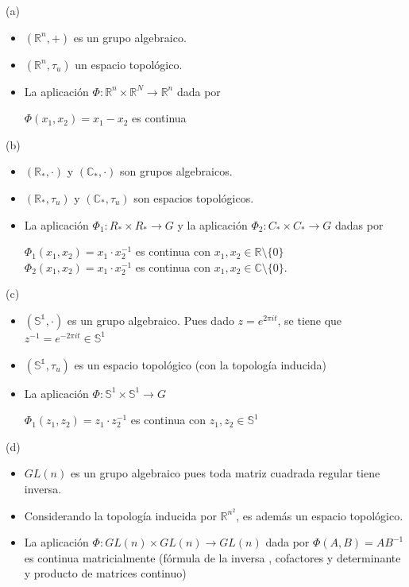 \documentclass[
  a4paper,
  spanish,
  12pt,
]{scrartcl}
\begin{document}
\begin{sol}

(a)

\begin{itemize}
\item{$(\mathbb{R}^n, +)$ es un grupo algebraico.}
\item{$(\mathbb{R}^n, \tau_u)$ un espacio topológico.}
\item{La aplicación $\Phi: \mathbb{R}^n \times \mathbb{R}^N \rightarrow \mathbb{R}^n$ dada por

$\Phi(x_1, x_2) = x_1 - x_2$ es continua}
\end{itemize}

(b)

\begin{itemize}
\item{$(\mathbb{R_*}, \cdot)$ y $(\mathbb{C_*}, \cdot)$ son grupos algebraicos.}
\item{$(\mathbb{R_*}, \tau_u)$ y $(\mathbb{C_*}, \tau_u)$ son espacios topológicos.}
\item{La aplicación $\Phi_1: R_* \times R_* \rightarrow G$  y la 
aplicación $\Phi_2: C_* \times C_* \rightarrow G$ dadas por
	
$\Phi_1(x_1, x_2) = x_1 \cdot x_2^{-1}$ es continua con $x_1, x_2 \in \mathbb{R} \setminus \{0\}$ \\
$\Phi_2(x_1, x_2) = x_1 \cdot x_2^{-1}$ es continua con $x_1, x_2 \in \mathbb{C} \setminus \{0\}$.}
\end{itemize}

(c)


\begin{itemize}
\item{$(\mathbb{S^1}, \cdot)$ es un grupo algebraico. Pues dado $z=e^{2\pi it}$, se tiene que $z^{-1}=e^{-2\pi it} \in \mathbb{S}^1$}
\item{$(\mathbb{S^1}, \tau_u)$ es un espacio topológico (con la topología inducida)}
\item{La aplicación $\Phi: \mathbb{S}^1 \times \mathbb{S}^1 \rightarrow G$  
	
$\Phi_1(z_1, z_2) = z_1 \cdot z_2^{-1}$ es continua con $z_1, z_2 \in \mathbb{S}^1$ \\
}
\end{itemize}

(d) 

\begin{itemize}
\item{$GL(n)$ es un grupo algebraico pues toda matriz cuadrada regular tiene inversa.}
\item{Considerando la topología inducida por $\mathbb{R}^{n^2}$, es además un espacio topológico.}
\item{La aplicación $\Phi: GL(n) \times GL(n) \rightarrow GL(n)$ dada por $\Phi(A, B) = AB^{-1}$
es continua matricialmente (fórmula de la inversa , cofactores y determinante y producto de matrices continuo)}
\end{itemize}


\end{sol}
\end{document}
